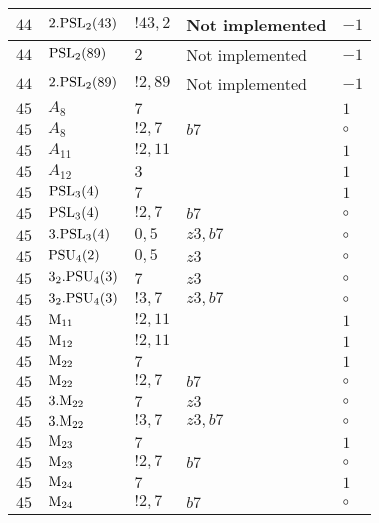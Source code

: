 \documentclass[a4paper, 11pt]{article}
\begin{document}
\begin{longtable}{lllll}
        $ 44 $ & $ 2.{\rm PSL}_{2}(43) $ & $ !43, 2 $ &  Not implemented & $ -1$ \\ \hline
        $ 44 $ & $ {\rm PSL}_{2}(89) $ & $ 2 $ &  Not implemented & $ -1$ \\ \hline
        $ 44 $ & $ 2.{\rm PSL}_{2}(89) $ & $ !2, 89 $ &  Not implemented & $ -1$ \\ \hline
        $ 45 $ & $ A_{8} $ & $ 7 $ & $ ~ $ & $ 1$ \\ \hline
        $ 45 $ & $ A_{8} $ & $ ! 2,7 $ & $ b7 $ &  $\circ$ \\ \hline
        $ 45 $ & $ A_{11} $ & $ ! 2,11 $ & $ ~ $ & $ 1$ \\ \hline
        $ 45 $ & $ A_{12} $ & $ 3 $ & $ ~ $ & $ 1$ \\ \hline
        $ 45 $ & $ {\rm PSL}_{3}(4) $ & $ 7 $ & $ ~ $ & $ 1$ \\ \hline
        $ 45 $ & $ {\rm PSL}_{3}(4) $ & $ ! 2,7 $ & $ b7 $ &  $\circ$ \\ \hline
        $ 45 $ & $ 3.{\rm PSL}_{3}(4) $ & $ 0,5 $ & $ z3, b7 $ &  $\circ$ \\ \hline
        $ 45 $ & $ {\rm PSU}_{4}(2) $ & $ 0,5 $ & $ z3 $ &  $\circ$ \\ \hline
        $ 45 $ & $ 3_2.{\rm PSU}_{4}(3) $ & $ 7 $ & $ z3 $ &  $\circ$ \\ \hline
        $ 45 $ & $ 3_2.{\rm PSU}_{4}(3) $ & $ ! 3,7 $ & $ z3, b7 $ &  $\circ$ \\ \hline
        $ 45 $ & $ {\rm M}_{11} $ & $ ! 2,11 $ & $ ~ $ & $ 1$ \\ \hline
        $ 45 $ & $ {\rm M}_{12} $ & $ ! 2,11 $ & $ ~ $ & $ 1$ \\ \hline
        $ 45 $ & $ {\rm M}_{22} $ & $ 7 $ & $ ~ $ & $ 1$ \\ \hline
        $ 45 $ & $ {\rm M}_{22} $ & $ ! 2,7 $ & $ b7 $ &  $\circ$ \\ \hline
        $ 45 $ & $ 3.{\rm M}_{22} $ & $ 7 $ & $ z3 $ &  $\circ$ \\ \hline
        $ 45 $ & $ 3.{\rm M}_{22} $ & $ ! 3,7 $ & $ z3, b7 $ &  $\circ$ \\ \hline
        $ 45 $ & $ {\rm M}_{23} $ & $ 7 $ & $ ~ $ & $ 1$ \\ \hline
        $ 45 $ & $ {\rm M}_{23} $ & $ ! 2,7 $ & $ b7 $ &  $\circ$ \\ \hline
        $ 45 $ & $ {\rm M}_{24} $ & $ 7 $ & $ ~ $ & $ 1$ \\ \hline
        $ 45 $ & $ {\rm M}_{24} $ & $ ! 2,7 $ & $ b7 $ &  $\circ$ \\ \hline

\end{longtable}
\end{document}
